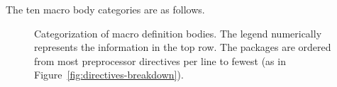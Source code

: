 \documentclass[10pt]{article}
\newcommand{\captionsmall}[1]{\caption[]{\small #1}}
\begin{document}
The ten macro body categories are as follows.



\begin{figure}
\centerline{}
\captionsmall{Categorization of macro definition bodies.  The legend numerically
  represents the information in the top row.  The packages are ordered from
  most preprocessor directives per line to fewest (as in
  Figure~\ref{fig:directives-breakdown}).}
\label{fig:categorization}
\end{figure}



\label{sec:categorization-details}
\end{document}
